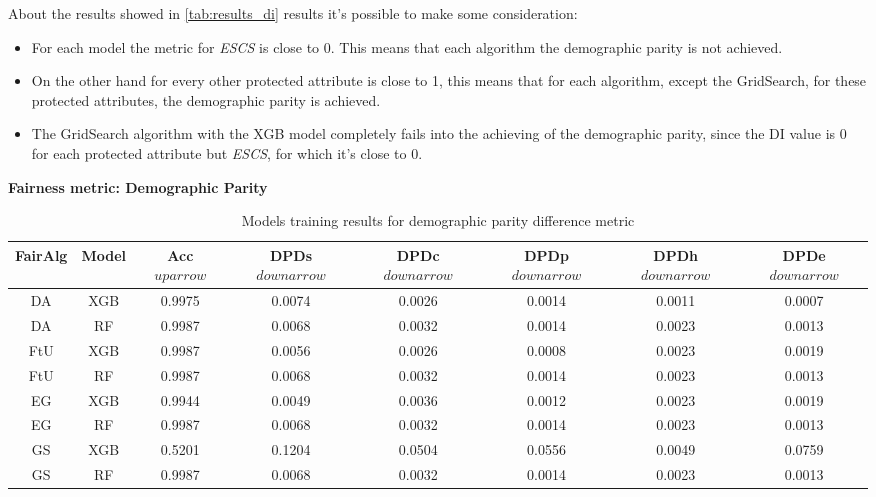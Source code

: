 About the results showed in \cref{tab:results_di} results it's possible to make some consideration:

\begin{itemize}

    \item For each model the metric for \emph{ESCS} is close to 0. This means that each algorithm the demographic parity is not achieved.

    \item On the other hand for every other protected attribute is close to 1, this means that for each algorithm, except the GridSearch, for these protected attributes, the demographic parity is achieved.

    \item The GridSearch algorithm with the XGB model completely fails into the achieving of the demographic parity, since the DI value is 0 for each protected attribute but \emph{ESCS}, for which it's close to 0.
    
\end{itemize}

\textbf{Fairness metric: Demographic Parity}

\begin{table}
    \centering
    \begin{tabular}{|c|c|c|c|c|c|c|c|}
        \hline
        \textbf{FairAlg} & \textbf{Model} & \textbf{Acc} $uparrow$ & \textbf{DPDs} $downarrow$ & \textbf{DPDc} $downarrow$ & \textbf{DPDp} $downarrow$ & \textbf{DPDh} $downarrow$ & \textbf{DPDe} $downarrow$ \\
        \hline
        DA & XGB & 0.9975 & 0.0074 & 0.0026 & 0.0014 & 0.0011 & 0.0007\\
        \hline
        DA & RF & 0.9987 & 0.0068 & 0.0032 & 0.0014 & 0.0023 & 0.0013\\
        \hline
        FtU & XGB & 0.9987 & 0.0056 & 0.0026 & 0.0008 & 0.0023 & 0.0019 \\
        \hline
        FtU & RF & 0.9987 & 0.0068 & 0.0032 & 0.0014 & 0.0023 & 0.0013 \\
        \hline
        EG & XGB & 0.9944 & 0.0049 & 0.0036 & 0.0012 & 0.0023 & 0.0019 \\
        \hline
        EG & RF & 0.9987 & 0.0068 & 0.0032 & 0.0014 & 0.0023 & 0.0013 \\
        \hline
        GS & XGB & 0.5201 & 0.1204 & 0.0504 & 0.0556 & 0.0049 & 0.0759 \\
        \hline
        GS & RF & 0.9987 & 0.0068 & 0.0032 & 0.0014 & 0.0023 & 0.0013 \\
        \hline
    \end{tabular}
    \caption{Models training results for demographic parity difference metric}
    \label{fig:results_dpd}
\end{table}

